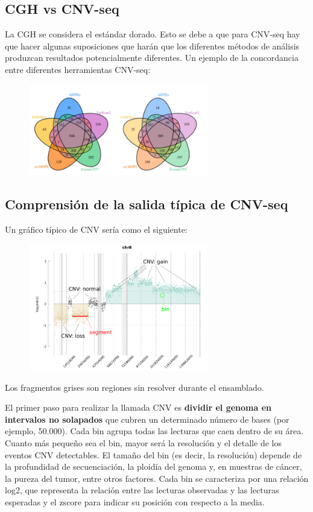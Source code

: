 \subsection{CGH vs CNV-seq}
La CGH se considera el estándar dorado. Esto se debe a que para CNV-seq hay que hacer algunas suposiciones que harán que los diferentes métodos de análisis produzcan resultados potencialmente diferentes. Un ejemplo de la concordancia entre diferentes herramientas CNV-seq:

\begin{figure}[h!]
\centering
\includegraphics[width = 0.7\textwidth]{figs/cgh-vs-cnvseq.png}
\end{figure}

\subsection{Comprensión de la salida típica de CNV-seq}
Un gráfico típico de CNV sería como el siguiente:

\begin{figure}[h!]
\centering
\includegraphics[width = 0.7\textwidth]{figs/cnv-plot.png}
\end{figure}
Los fragmentos grises son regiones sin resolver durante el ensamblado. 

El primer paso para realizar la llamada CNV es \textbf{dividir el genoma en intervalos no solapados} que cubren un determinado número de bases (por ejemplo, 50.000). Cada bin agrupa todas las lecturas que caen dentro de su área. Cuanto más pequeño sea el bin, mayor será la resolución y el detalle de los eventos CNV detectables.
El tamaño del bin (es decir, la resolución) depende de la profundidad de secuenciación, la ploidía del genoma y, en muestras de cáncer, la pureza del tumor, entre otros factores.
Cada bin se caracteriza por una relación log2, que representa la relación entre las lecturas observadas y las lecturas esperadas y el zscore para indicar su posición con respecto a la media.

